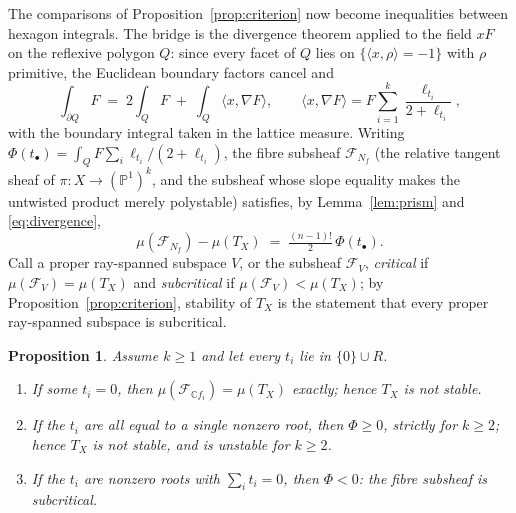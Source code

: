 \documentclass[11pt]{amsart}
\newtheorem{proposition}[theorem]{Proposition}
\theoremstyle{definition}
\theoremstyle{remark}
\newcommand{\PP}{\mathbb{P}}
\newcommand{\CC}{\mathbb{C}}
\begin{document}
The comparisons of Proposition~\ref{prop:criterion} now become inequalities
between hexagon integrals. The bridge is the divergence theorem applied to
the field $x F$ on the reflexive polygon $Q$: since every facet of $Q$ lies
on $\{\langle x, \rho \rangle = -1\}$ with $\rho$ primitive, the Euclidean
boundary factors cancel and
\begin{equation}\label{eq:divergence}
\int_{\partial Q} F \;=\; 2 \int_Q F \;+\; \int_Q \langle x, \nabla F
\rangle, \qquad
\langle x, \nabla F\rangle = F \sum_{i=1}^k
\frac{\ell_{t_i}}{2 + \ell_{t_i}},
\end{equation}
with the boundary integral taken in the lattice measure. Writing
$\Phi(t_\bullet) = \int_Q F \sum_i \ell_{t_i}/(2+\ell_{t_i})$, the fibre
subsheaf $\mathcal{F}_{N_f}$ (the relative tangent sheaf of
$\pi \colon X \to (\PP^1)^k$, and the subsheaf whose slope equality makes
the untwisted product merely polystable) satisfies, by
Lemma~\ref{lem:prism} and \eqref{eq:divergence},
\begin{equation}\label{eq:phigap}
\mu(\mathcal{F}_{N_f}) - \mu(T_X) \;=\; \tfrac{(n-1)!}{2}\, \Phi(t_\bullet).
\end{equation}
Call a proper ray-spanned subspace $V$, or the subsheaf $\mathcal{F}_V$,
\emph{critical} if $\mu(\mathcal{F}_V) = \mu(T_X)$ and \emph{subcritical}
if $\mu(\mathcal{F}_V) < \mu(T_X)$; by
Proposition~\ref{prop:criterion}, stability of $T_X$ is the statement that
every proper ray-spanned subspace is subcritical.

\begin{proposition}\label{prop:partialstab}
Assume $k\ge1$ and let every $t_i$ lie in $\{0\} \cup R$.
\begin{enumerate}
\item If some $t_i = 0$, then $\mu(\mathcal{F}_{\CC f_i}) = \mu(T_X)$
exactly; hence $T_X$ is not stable.
\item If the $t_i$ are all equal to a single nonzero root, then
$\Phi \ge 0$, strictly for $k \ge 2$; hence $T_X$ is not stable, and is
unstable for $k \ge 2$.
\item If the $t_i$ are nonzero roots with $\sum_i t_i = 0$, then
$\Phi < 0$: the fibre subsheaf is subcritical.
\end{enumerate}
\end{proposition}
\end{document}
